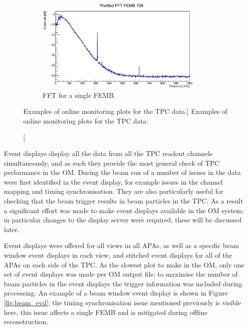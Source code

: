 \begin{figure}
	\begin{subfigure}[b]{0.85\textwidth}
		\centering
		\vspace{3mm}
		\includegraphics[width=0.9\textwidth]{figures/tpc_fft.pdf}
		\caption {FFT for a single FEMB.}
		\label{fig:TPC_FFT}
	\end{subfigure}

	\caption
	[Examples of online monitoring plots for the TPC data.]
	{Examples of online monitoring plots for the TPC data.}
	\label{fig:tpc_om}

\end{figure}

Event displays display all the data from all the TPC readout channels
simultaneously, and as such they provide the most general check of TPC 
performance in the OM. During the beam run of \protodune{} a number of issues in
the data were first identified in the event display, for example issues in the 
channel mapping and timing synchronisation. They are also particularly useful 
for checking that the beam trigger results in beam particles in the TPC. As 
a result a significant effort was made to make event displays available in 
the \protodune{} OM system; in particular changes to the display server 
were required, these will be discussed later. 

Event displays were offered for all views in all APAs, as well as a specific 
beam window event displays in each view, and stitched event displays for all 
of the APAs on each side of the TPC. As the slowest plot to make in the OM, 
only one set of event displays was made per OM output file; to maximise the 
number of beam particles in the event displays the trigger information was 
included during processing. An example of a beam window event display is shown 
in Figure \ref{fig:beam_evd}; the timing synchronisation issue mentioned
previously is visible here, this issue affects a single FEMB and is mitigated 
during offline reconstruction.  

